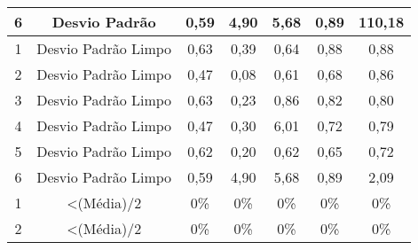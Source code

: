 \begin{table}[]
\begin{tabular}{|c|c|ccccc|}
6                         & Desvio Padrão                                                              & 0,59                       & 4,90                       & 5,68                       & 0,89                       & 110,18                      \\ \hline
1                         & Desvio Padrão Limpo                                                        & 0,63                       & 0,39                       & 0,64                       & 0,88                       & 0,88                        \\
2                         & Desvio Padrão Limpo                                                        & 0,47                       & 0,08                       & 0,61                       & 0,68                       & 0,86                        \\
3                         & Desvio Padrão Limpo                                                        & 0,63                       & 0,23                       & 0,86                       & 0,82                       & 0,80                        \\
4                         & Desvio Padrão Limpo                                                        & 0,47                       & 0,30                       & 6,01                       & 0,72                       & 0,79                        \\
5                         & Desvio Padrão Limpo                                                        & 0,62                       & 0,20                       & 0,62                       & 0,65                       & 0,72                        \\
6                         & Desvio Padrão Limpo                                                        & 0,59                       & 4,90                       & 5,68                       & 0,89                       & 2,09                        \\ \hline
1                         & \textless (Média)/2                                                        & 0\%                     & 0\%                     & 0\%                     & 0\%                     & 0\%                      \\
2                         & \textless (Média)/2                                                        & 0\%                     & 0\%                     & 0\%                     & 0\%                     & 0\%                      \\

\end{tabular}
\end{table}
